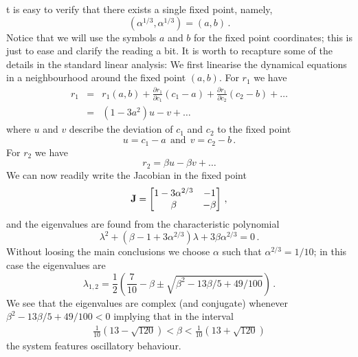 t is easy to verify that there exists a single fixed point, namely, 
\begin{equation}
	(\alpha^{1/3}, \alpha^{1/3}) = (a, b)\, .
\end{equation}
Notice that we will use the symbols $a$ and $b$ for the fixed point coordinates; this is just 
to ease and clarify the reading a bit. It is worth to recapture some of the details in the standard 
linear analysis: We first linearise the dynamical equations in a neighbourhood 
around the fixed point $(a,b)$. For $r_1$ we have
\begin{eqnarray}
	r_1 &=& r_1(a,b) + \frac{\partial r_1}{\partial c_1}(c_1-a) + \frac{\partial r_1}{\partial c_2}(c_2-b) + \ldots \\
				 &=&	(1-3a^2) u - v + \dots
\end{eqnarray}
where $u$ and $v$ describe the deviation of $c_1$ and $c_2$ to the fixed point
\begin{equation}
	u = c_1 - a \ \ \text{and} \ \ v = c_2 - b \, .
\end{equation}
For $r_2$ we have 
\begin{equation}
	r_2 = \beta u - \beta v + \ldots
\end{equation}
We can now readily write the Jacobian in the fixed point 
\begin{equation}
\mathbf{J} = 
	\begin{bmatrix}
    1-3\alpha^{2/3} & -1 \\
    \beta & -\beta
 \end{bmatrix} \, ,
\end{equation}
and the eigenvalues are found from the characteristic polynomial
\begin{equation}
	\lambda^2 + (\beta-1+3\alpha^{2/3})\lambda + 3\beta\alpha^{2/3} = 0 \, .
\end{equation}
Without loosing the main conclusions we choose $\alpha$ such that $\alpha^{2/3}=1/10$; 
in this case the eigenvalues are 
\begin{equation}
	\lambda_{1,2} = \frac{1}{2}\left(
	\frac{7}{10}-\beta \pm \sqrt{\beta^2-13\beta/5+49/100} 
	\right) \, .
\end{equation}
We see that the eigenvalues are complex (and conjugate) 
whenever $\beta^2-13\beta/5+49/100<0$ implying that in the interval
\begin{eqnarray}
	\frac{1}{10}\left(13 - \sqrt{120}\right) < \beta <  \frac{1}{10}\left(13 + \sqrt{120}\right) 
\end{eqnarray}
the system features oscillatory behaviour. 

